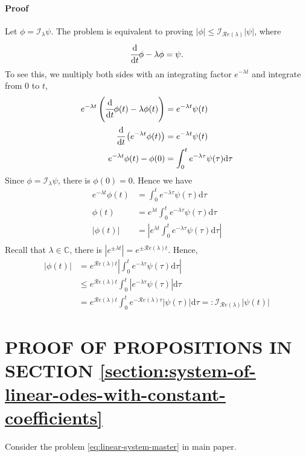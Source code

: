 \documentclass[accepted]{uai2023}
\newcommand{\dt}[1]{\cfrac{\mathrm{d} #1}{\mathrm{d} t}}
\newcommand{\I}{\mathcal{I}}
\renewcommand{\Re}[1]{\mathcal{R}e\left(#1\right)}
\begin{document}
    \paragraph{Proof} 
    Let $\phi = \I_\lambda \psi$. The problem is equivalent to proving $|\phi| \leq \I_{\Re{\lambda}}|\psi|$, where
    \begin{equation}
        \dt{}\phi-\lambda\phi = \psi.
    \end{equation}
    To see this, we multiply both sides with an integrating factor $e^{-\lambda t}$ and integrate from $0$ to $t$,
    \begin{align}
        e^{-\lambda t} \left(\dt{}\phi(t)-\lambda\phi(t)\right) &= e^{-\lambda t}\psi(t) \\
        \dt{}\left(e^{-\lambda t}\phi(t)\right) &= e^{-\lambda t}\psi(t) \\
        e^{-\lambda t}\phi(t) - \phi(0) &= \int_{0}^{t} e^{-\lambda \tau}\psi(\tau) \mathrm{d}\tau
    \end{align}
    Since $\phi = \I_{\lambda} \psi$, there is $\phi(0) = 0$. Hence we have
    \begin{align}
        e^{-\lambda t}\phi(t) &= \int_{0}^{t} e^{-\lambda \tau}\psi(\tau) \mathrm{d}\tau \\
        \phi(t) &= e^{\lambda t}\int_{0}^{t} e^{-\lambda \tau}\psi(\tau) \mathrm{d}\tau \\
        |\phi(t)| &= \left|e^{\lambda t}\int_{0}^{t} e^{-\lambda \tau}\psi(\tau) \mathrm{d}\tau\right| \\
    \end{align}
    Recall that $\lambda \in \mathbb{C}$, there is $\left|e^{\pm \lambda t}\right| = e^{\pm \Re{\lambda} t}$. 
    Hence,
    \begin{align}
        |\phi(t)| &= e^{\Re{\lambda} t} \left|\int_{0}^{t} e^{-\lambda \tau}\psi(\tau) \mathrm{d}\tau \right| \\
        &\leq e^{\Re{\lambda} t} \int_{0}^{t} \left|e^{-\lambda \tau}\psi(\tau) \right|\mathrm{d}\tau  \\
        &=e^{\Re{\lambda} t} \int_{0}^{t} e^{-\Re{\lambda} \tau}|\psi(\tau)|\mathrm{d}\tau =: \I_{\Re{\lambda}}|\psi(t)|
    \end{align}

\section{PROOF OF PROPOSITIONS IN SECTION \ref{section:system-of-linear-odes-with-constant-coefficients}}
    Consider the problem \ref{eq:linear-system-master} in main paper. 
\end{document}
